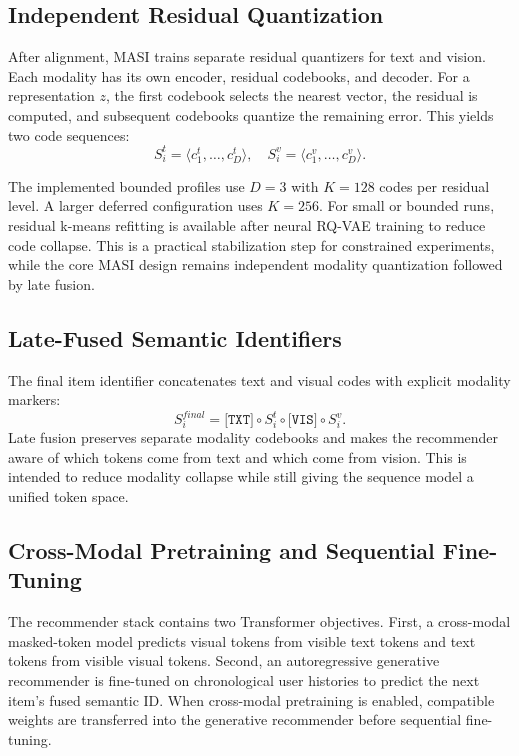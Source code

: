 \documentclass[conference]{IEEEtran}
\begin{document}
\subsection{Independent Residual Quantization}
After alignment, MASI trains separate residual quantizers for text and vision. Each modality has its own encoder, residual codebooks, and decoder. For a representation $z$, the first codebook selects the nearest vector, the residual is computed, and subsequent codebooks quantize the remaining error. This yields two code sequences:
\begin{equation}
S^t_i = \langle c^t_1,\ldots,c^t_D\rangle,
\quad
S^v_i = \langle c^v_1,\ldots,c^v_D\rangle.
\end{equation}

The implemented bounded profiles use $D=3$ with $K=128$ codes per residual level. A larger deferred configuration uses $K=256$. For small or bounded runs, residual k-means refitting is available after neural RQ-VAE training to reduce code collapse. This is a practical stabilization step for constrained experiments, while the core MASI design remains independent modality quantization followed by late fusion.

\subsection{Late-Fused Semantic Identifiers}
The final item identifier concatenates text and visual codes with explicit modality markers:
\begin{equation}
S^{final}_i =
\texttt{[TXT]} \circ S^t_i \circ \texttt{[VIS]} \circ S^v_i.
\end{equation}
Late fusion preserves separate modality codebooks and makes the recommender aware of which tokens come from text and which come from vision. This is intended to reduce modality collapse while still giving the sequence model a unified token space.

\subsection{Cross-Modal Pretraining and Sequential Fine-Tuning}
The recommender stack contains two Transformer objectives. First, a cross-modal masked-token model predicts visual tokens from visible text tokens and text tokens from visible visual tokens. Second, an autoregressive generative recommender is fine-tuned on chronological user histories to predict the next item's fused semantic ID. When cross-modal pretraining is enabled, compatible weights are transferred into the generative recommender before sequential fine-tuning.
\end{document}
